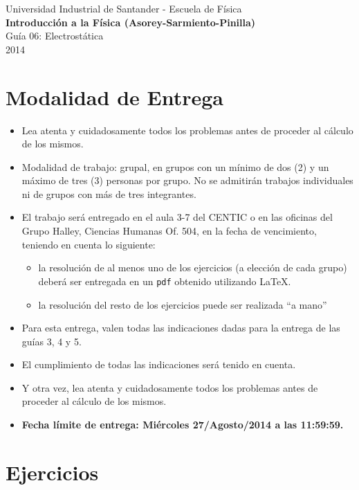 \documentclass[a4paper,12pt]{article}
\begin{document}
\begin{center}
  {\small{Universidad Industrial de Santander - Escuela de Física}}\\
  {\bf{Introducción a la Física (Asorey-Sarmiento-Pinilla)}}\\
  \vspace{0.4cm}
  Guía 06: Electrostática\\ 2014
\end{center}

\renewcommand{\labelenumi}{\arabic{enumi})}
\renewcommand{\labelenumii}{\arabic{enumii})}

\section*{Modalidad de Entrega}

\begin{itemize}
  \item Lea atenta y cuidadosamente todos los problemas antes de proceder al cálculo de los mismos.
  \item Modalidad de trabajo: grupal, en grupos con un mínimo de dos (2) y un máximo de tres (3) personas por grupo. No se admitirán trabajos individuales ni de grupos con más de tres integrantes. 
  \item El trabajo será entregado en el aula 3-7 del CENTIC o en las oficinas del Grupo Halley, Ciencias Humanas Of. 504, en la fecha de vencimiento, teniendo en cuenta lo siguiente:
  \begin{itemize}
    \item la resolución de al menos uno de los ejercicios (a elección de cada grupo) deberá ser entregada en un \texttt{pdf} obtenido utilizando \LaTeX.
    \item la resolución del resto de los ejercicios puede ser realizada ``a mano''
  \end{itemize}
  \item Para esta entrega, valen todas las indicaciones dadas para la entrega de las guías 3, 4 y 5.
  \item El cumplimiento de todas las indicaciones será tenido en cuenta.
  \item Y otra vez, lea atenta y cuidadosamente todos los problemas antes de proceder al cálculo de los mismos.
  \item {\Large{\bf{Fecha límite de entrega: Miércoles 27/Agosto/2014 a las 11:59:59.}}}
\end{itemize}

\section*{Ejercicios}
\end{document}
